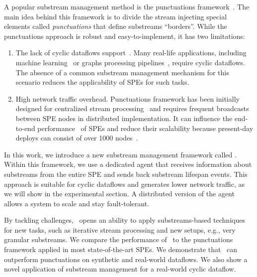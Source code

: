 A popular substream management method is the punctuations framework~\cite{tucker2003exploiting}. The main idea behind this framework is to divide the stream injecting special elements called {\em punctuations} that define substreams ``borders''. While the punctuations approach is robust and easy-to-implement, it has two limitations:
\begin{enumerate}
    \item The lack of cyclic dataflows support~\cite{carbone2018scalable}. Many real-life applications, including machine learning~\cite{webirte} or graphs processing pipelines~\cite{xu2018fault}, require cyclic dataflows. The absence of a common substream management mechanism for this scenario reduces the applicability of SPEs for such tasks.
    \item High network traffic overhead. Punctuations framework has been initially designed for centralized stream processing~\cite{Tucker:2003:EPS:776752.776780} and requires frequent broadcasts between SPE nodes in distributed implementation. It can influence the end-to-end performance~\cite{DBLP:journals/pvldb/BegoliACHKKMS21} of SPEs and reduce their scalability because present-day deploys can consist of over 1000 nodes~\cite{Carbone:2017:SMA:3137765.3137777}. 
\end{enumerate}

In this work, we introduce a new substream management framework called \tracker. Within this framework, we use a dedicated agent that receives information about substreams from the entire SPE and sends back substream lifespan events. This approach is suitable for cyclic dataflows and generates lower network traffic, as we will show in the experimental section. A distributed version of the agent allows a system to scale and stay fault-tolerant.

By tackling challenges, \tracker\ opens an ability to apply substreams-based techniques for new tasks, such as iterative stream processing and new setups, e.g., very granular substreams. We compare the performance of \tracker\ to the punctuations framework applied in most state-of-the-art SPEs. We demonstrate that \tracker\ can outperform punctuations on synthetic and real-world dataflows. We also show a novel application of substream management for a real-world cyclic dataflow. 

